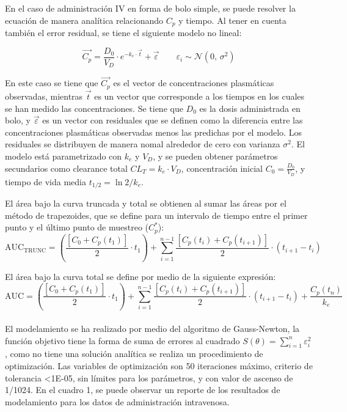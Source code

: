 \documentclass[]{article}
\begin{document}
En el caso de administración IV en forma de bolo simple, se puede
resolver la ecuación de manera analítica relacionando \(C_{p}\) y
tiempo. Al tener en cuenta también el error residual, se tiene el
siguiente modelo no lineal:

\[\vec{C_{p}} = \frac{D_{0}}{V_{D}}\cdot  e^{-k_{e}\cdot \vec{t}} + \vec{\varepsilon} \qquad \varepsilon_{i}\sim \mathcal{N}(0,\,\sigma^{2})\]

En este caso se tiene que \(\vec{C_{p}}\) es el vector de
concentraciones plasmáticas observadas, mientras \(\vec{t}\) es un
vector que corresponde a los tiempos en los cuales se han medido las
concentraciones. Se tiene que \(D_{0}\) es la dosis administrada en
bolo, y \(\vec{\varepsilon}\) es un vector con residuales que se definen
como la diferencia entre las concentraciones plasmáticas observadas
menos las predichas por el modelo. Los residuales se distribuyen de
manera nomal alrededor de cero con varianza \(\sigma^{2}\). El modelo
está parametrizado con \(k_{e}\) y \(V_{D}\), y se pueden obtener
parámetros secundarios como clearance total
\(CL_{T} = k_{e} \cdot V_{D}\), concentración inicial
\(C_{0} = \frac{D_{0}}{V_{D}}\), y tiempo de vida media
\(t_{1/2} = \ln{2}/k_{e}\).

El área bajo la curva truncada y total se obtienen al sumar las áreas
por el método de trapezoides, que se define para un intervalo de tiempo
entre el primer punto y el último punto de muestreo (\(C_{p}^{*}\)):\\
\[\textrm{AUC}_{\textrm{TRUNC}} = \left(\frac{ \left[ C_{0}+C_{p}(t_{1})\right ]}{2} \cdot t_{1}\right ) + \sum_{i=1}^{n-1}{ \frac{\left [C_{p}(t_{i})+C_{p}(t_{i+1})\right ]}{2} \cdot (t_{i+1}-t_{i})}\]

El área bajo la curva total se define por medio de la siguiente
expresión:\\
\[\textrm{AUC} = \left(\frac{\left[ C_{0}+C_{p}(t_{1}) \right ]}{2} \cdot t_{1}\right ) + \sum_{i=1}^{n-1}{ \frac{\left[ C_{p}(t_{i})+C_{p}(t_{i+1})\right]}{2} \cdot (t_{i+1}-t_{i})} + \frac{C_{p}(t_{n})}{k_{e}}\]\\
El modelamiento se ha realizado por medio del algoritmo de Gauss-Newton,
la función objetivo tiene la forma de suma de errores al cuadrado
\(S(\theta) = \sum_{i=1}^{n}{\varepsilon_{i}^2}\), como no tiene una
solución analítica se realiza un procedimiento de optimización. Las
variables de optimización son 50 iteraciones máximo, criterio de
tolerancia \textless{}1E-05, sin límites para los parámetros, y con
valor de ascenso de 1/1024. En el cuadro 1, se puede observar un reporte
de los resultados de modelamiento para los datos de administración
intravenosa.
\end{document}
